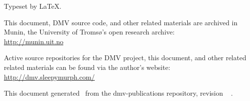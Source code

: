 
\clearpage
\vspace*{\fill}

Typeset by \LaTeX.

This document, \gls{DMV} source code, and other related materials are archived
in Munin, the University of Tromsø's open research archive: \\
\url{http://munin.uit.no}

Active source repositories for the \gls{DMV} project, this document, and other
related related materials can be found via the author's website: \\
\url{http://dmv.sleepymurph.com/}

This document generated \GITAuthorDate\ from the dmv-publications
repository, revision
\ifx\GITTags\empty
\GITAbrHash
\else
\GITAbrHash\ \GITTags
\fi
.

\clearpage
